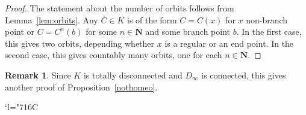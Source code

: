 \documentclass[JEP,XML,SOM,Unicode,NoFloatCountersInSection]{cedram}
\newcommand{\Changelback}{\mathcode`l="716C}
\theoremstyle{plain}
\theoremstyle{definition}
\newtheorem{rem}[thm]{Remark}
\newcommand{\NN}{\mathbf{N}}
\begin{document}
\begin{proof}
The statement about the number of orbits follows from Lemma~\ref{lem:orbits}. Any $C\in K$ is of the form $C=C(x)$ for $x$ non-branch point or $C=C^n(b)$ for some $n\in\overline{\NN}$ and some branch point $b$. In the first case, this gives two orbits, depending whether $x$ is a regular or an end point. In the second case, this gives countably many orbits, one for each $n\in\overline{\NN}$.
\end{proof}

\begin{rem} Since $K$ is totally disconnected and $D_\infty$ is connected, this gives another proof of Proposition~\ref{nothomeo}.
\end{rem}

\Changelback
\backmatter


\end{document}

